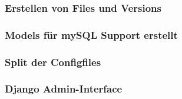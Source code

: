 \subsubsection{Erstellen von Files und Versions}

\subsubsection{Models für mySQL Support erstellt}

\subsubsection{Split der Configfiles}

\subsubsection{Django Admin-Interface}
